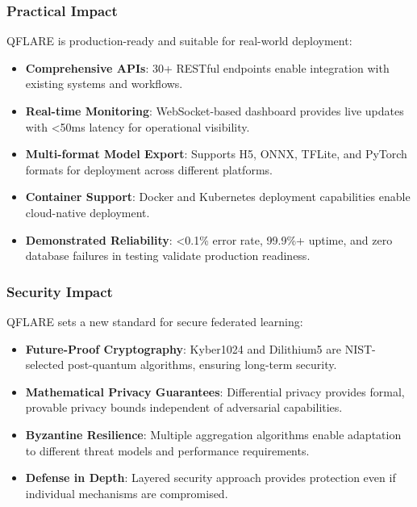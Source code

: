 \documentclass[12pt,a4paper]{article}
\begin{document}
\subsubsection{Practical Impact}

QFLARE is production-ready and suitable for real-world deployment:

\begin{itemize}
    \item \textbf{Comprehensive APIs}: 30+ RESTful endpoints enable integration with existing systems and workflows.
    
    \item \textbf{Real-time Monitoring}: WebSocket-based dashboard provides live updates with <50ms latency for operational visibility.
    
    \item \textbf{Multi-format Model Export}: Supports H5, ONNX, TFLite, and PyTorch formats for deployment across different platforms.
    
    \item \textbf{Container Support}: Docker and Kubernetes deployment capabilities enable cloud-native deployment.
    
    \item \textbf{Demonstrated Reliability}: <0.1\% error rate, 99.9\%+ uptime, and zero database failures in testing validate production readiness.
\end{itemize}

\subsubsection{Security Impact}

QFLARE sets a new standard for secure federated learning:

\begin{itemize}
    \item \textbf{Future-Proof Cryptography}: Kyber1024 and Dilithium5 are NIST-selected post-quantum algorithms, ensuring long-term security.
    
    \item \textbf{Mathematical Privacy Guarantees}: Differential privacy provides formal, provable privacy bounds independent of adversarial capabilities.
    
    \item \textbf{Byzantine Resilience}: Multiple aggregation algorithms enable adaptation to different threat models and performance requirements.
    
    \item \textbf{Defense in Depth}: Layered security approach provides protection even if individual mechanisms are compromised.
\end{itemize}
\end{document}
